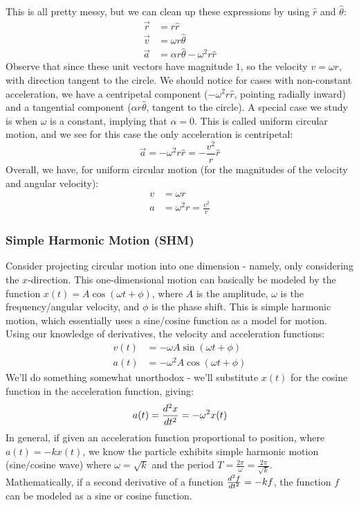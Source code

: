 This is all pretty messy, but we can clean up these expressions by using $\hat r$ and $\hat \theta$: 
\begin{align*}
	\vec r &= r \hat r \\
	\vec v &= \omega r \hat \theta \\
	\vec a &= \alpha r \hat \theta - \omega^2 r \hat r
\end{align*}
Observe that since these unit vectors have magnitude $1$, so the velocity $v = \omega r$, with direction tangent to the circle. We should notice for cases with non-constant acceleration, we have a centripetal component ($-\omega^2 r \hat r$, pointing radially inward) and a tangential component ($\alpha r \hat \theta$, tangent to the circle).
A special case we study is when $\omega$ is a constant, implying that $\alpha = 0$. This is called uniform circular motion, and we see for this case the only acceleration is centripetal: 
\[
	\vec a = - \omega^2 r \hat r = - \frac{v^2}{r} \hat r 
\]
Overall, we have, for uniform circular motion (for the magnitudes of the velocity and angular velocity):
\begin{align*}
	v &= \omega r \\
	a &= \omega^2 r = \frac{v^2}{r}
\end{align*}

\subsubsection{Simple Harmonic Motion (SHM)}
Consider projecting circular motion into one dimension - namely, only considering the $x$-direction. This one-dimensional motion can basically be modeled by the function $x(t) = A \cos(\omega t + \phi)$, where $A$ is the amplitude, $\omega$ is the frequency/angular velocity, and $\phi$ is the phase shift. This is simple harmonic motion, which essentially uses a sine/cosine function as a model for motion. \\
Using our knowledge of derivatives, the velocity and acceleration functions: 
\begin{align*}
	v(t) &= -\omega A \sin(\omega t + \phi) \\
	a(t) &= -\omega^2 A \cos(\omega t + \phi) 
\end{align*}
We'll do something somewhat unorthodox - we'll substitute $x(t)$ for the cosine function in the acceleration function, giving: 
\[
	a(t) = \frac{d^2 x}{d t^2} = -\omega^2 x(t)
\]
In general, if given an acceleration function proportional to position, where $a(t) = -kx(t)$, we know the particle exhibits simple harmonic motion (sine/cosine wave) where $\omega = \sqrt{k}$ and the period $T = \frac{2\pi}{\omega} = \frac{2\pi}{\sqrt{k}}$. \\
Mathematically, if a second derivative of a function $\frac{d^2 f}{d t^2} = -kf$, the function $f$ can be modeled as a sine or cosine function. 

